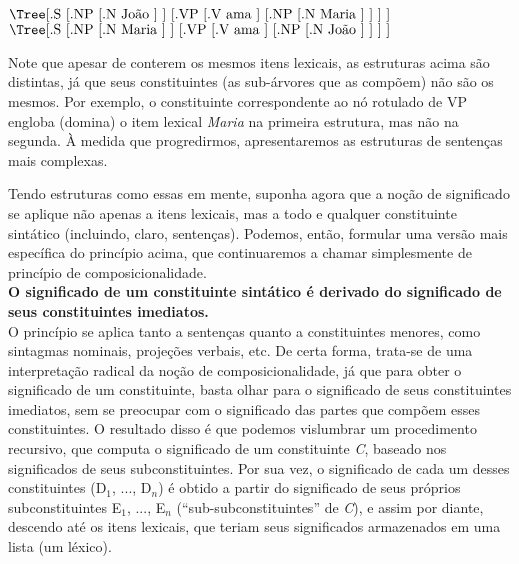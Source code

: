 $\vcenter{%
	\hbox{\Tree [.S [.NP [.N João ] ] [.VP [.V ama ] [.NP [.N Maria ] ] ] ]}} $ \hspace{1in} $ \vcenter{%
	\hbox{\Tree [.S [.NP [.N Maria ] ] [.VP [.V ama ] [.NP [.N João ] ] ] ]}} $

\bigskip

\n Note que apesar de conterem os mesmos itens lexicais, as
estruturas acima são distintas, já que seus constituintes (as
sub-árvores que as compõem) não são os mesmos. Por exemplo, o
constituinte correspondente ao nó rotulado de VP engloba (domina)
o item lexical \textit{Maria} na primeira estrutura, mas não na
segunda. À medida que progredirmos, apresentaremos as estruturas
de sen\-ten\-ças mais complexas.

Tendo estruturas como essas em mente, suponha agora que a no\-ção
de significado se aplique não apenas a itens lexicais, mas a todo
e qualquer constituinte sintático (incluindo, claro,
sen\-ten\-ças). Podemos, então, formular uma versão mais específica
do prin\-cí\-pio acima, que continuaremos a chamar simplesmente de prin\-cí\-pio de composicionalidade.\\

\noindent \textbf{O significado de um constituinte sintático é
derivado do significado de seus constituintes imediatos.}\\

\noindent O prin\-cí\-pio se aplica tanto a
sen\-ten\-ças quanto a constituintes menores, como sintagmas
nominais, proje\-çõ\-es verbais, etc. De certa forma, trata-se de
uma interpreta\-ção radical da no\-ção de composicionalidade, já
que para obter o significado de um constituinte, basta olhar para
o significado de seus constituintes imediatos, sem se preocupar
com o significado das partes que compõem esses constituintes. O
resultado disso é que podemos vislumbrar um procedimento
recursivo, que computa o significado de um constituinte
\textit{C}, baseado nos significados de seus subconstituintes.
Por sua vez, o significado de cada um desses constituintes
(D$_{1}$, ..., D$_{n}$) é obtido a partir do significado de
seus próprios subconstituintes E$_{1}$, ..., E$_{n}$
(``sub-subconstituintes'' de \textit{C}), e assim por diante,
descendo até os itens lexicais, que teriam seus significados
armazenados em uma lista (um léxico).


